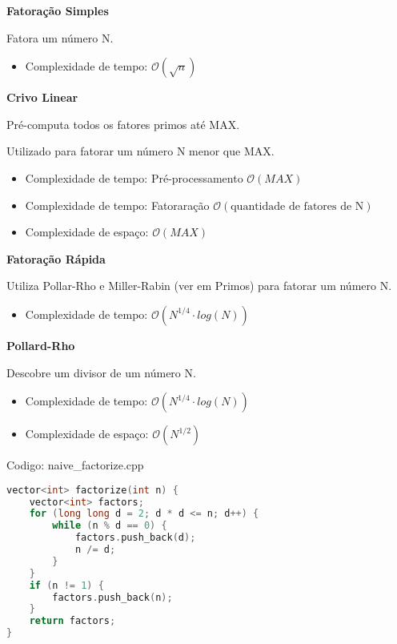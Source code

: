 \documentclass[10pt, a4paper, oneside]{book}
\begin{document}
\textbf{Fatoração Simples} 

Fatora um número N.



\begin{itemize}
\item Complexidade de tempo: $\mathcal{O}(\sqrt n )$
\end{itemize}



\textbf{Crivo Linear} 

Pré-computa todos os fatores primos até MAX.

Utilizado para fatorar um número N menor que MAX.



\begin{itemize}
\item Complexidade de tempo: Pré-processamento $\mathcal{O}(MAX)$
\item Complexidade de tempo: Fatoraração $\mathcal{O}(\text{quantidade de fatores de N})$
\item Complexidade de espaço: $\mathcal{O}(MAX)$
\end{itemize}



\textbf{Fatoração Rápida} 

Utiliza Pollar-Rho e Miller-Rabin (ver em Primos) para fatorar um número N.



\begin{itemize}
\item Complexidade de tempo: $\mathcal{O}(N^{1/4} \cdot log(N))$
\end{itemize}



\textbf{Pollard-Rho} 

Descobre um divisor de um número N.



\begin{itemize}
\item Complexidade de tempo: $\mathcal{O}(N^{1/4} \cdot log(N))$
\item Complexidade de espaço: $\mathcal{O}(N^{1/2})$
\end{itemize}

\hfill

Codigo: naive\_factorize.cpp

\begin{lstlisting}[language=C++]
vector<int> factorize(int n) {
    vector<int> factors;
    for (long long d = 2; d * d <= n; d++) {
        while (n % d == 0) {
            factors.push_back(d);
            n /= d;
        }
    }
    if (n != 1) {
        factors.push_back(n);
    }
    return factors;
}
\end{lstlisting}
\hfill
\end{document}
